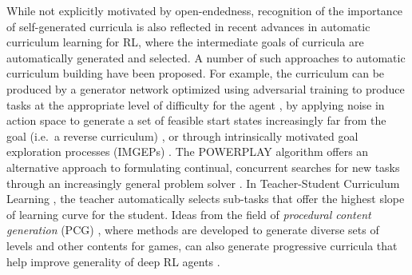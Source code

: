 \documentclass{article}
\newcommand{\ks}[1]{\comments{\textcolor{purple}{[Ken: #1]}}}
\newcommand{\rw}[1]{\comments{\textcolor{blue}{[Rui: #1]}}}
\newcommand{\comments}[1]{#1}
\begin{document}

While not explicitly motivated by open-endedness, recognition of the importance of self-generated curricula is also reflected in recent advances in automatic curriculum learning for RL, where the intermediate goals of curricula are automatically generated and selected. A number of such approaches to automatic curriculum building have been proposed.  For example, the curriculum can be produced by a generator network optimized using adversarial training to produce tasks at the appropriate level of difficulty for the agent \cite{florensa2018automatic}, by applying noise in action space to generate a set of feasible start states increasingly far from the goal (i.e.\ a reverse curriculum) \cite{pmlr-v78-florensa17a}, or through intrinsically motivated goal exploration processes (IMGEPs) \cite{forestier2017intrinsically}. The POWERPLAY algorithm offers an alternative approach to formulating continual, concurrent searches for new tasks through an increasingly general problem solver \cite{schmidhuber2013powerplay}. In Teacher-Student Curriculum Learning \cite{matiisen2017teacher},  the teacher automatically selects sub-tasks that offer the highest slope of learning curve for the student. Ideas from the field of \emph{procedural content generation} (PCG) \cite{togelius:ieeetciaig11,shaker2016procedural}, where methods are developed to generate diverse sets of levels and other contents for games, can also generate progressive curricula that help improve generality of deep RL agents \cite{justesen2017procedural}.    
\end{document}
